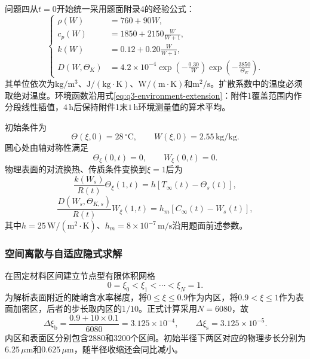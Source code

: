 \documentclass[withoutpreface,bwprint]{cumcmthesis}
\begin{document}
问题四从$t=0$开始统一采用题面附录4的经验公式：
\begin{equation}
\left\{
\begin{aligned}
\rho(W)&=760+90W,\\
c_p(W)&=1850+2150\frac{W}{W+1},\\
k(W)&=0.12+0.20\frac{W}{W+1},\\
D(W,\Theta_K)
&=4.2\times10^{-4}
\exp\!\left(-\frac{0.30}{W}\right)
\exp\!\left(-\frac{3850}{\Theta_K}\right).
\end{aligned}
\right.
\label{eq:q4-properties}
\end{equation}
其单位依次为$\mathrm{kg/m^3}$、$\mathrm{J/(kg\cdot K)}$、$\mathrm{W/(m\cdot K)}$和$\mathrm{m^2/s}$。扩散系数中的温度必须取绝对温度。环境函数沿用式\eqref{eq:q3-environment-extension}：附件1覆盖范围内作分段线性插值，$4\,\mathrm h$后保持附件1末$1\,\mathrm h$环境测量值的算术平均。

初始条件为
\begin{equation}
\Theta(\xi,0)=28\,{}^\circ\mathrm C,
\qquad
W(\xi,0)=2.55\,\mathrm{kg/kg}.
\label{eq:q4-initial-condition}
\end{equation}
圆心处由轴对称性满足
\begin{equation}
\Theta_\xi(0,t)=0,
\qquad
W_\xi(0,t)=0.
\label{eq:q4-center-boundary}
\end{equation}
物理表面的对流换热、传质条件变换到$\xi=1$后为
\begin{equation}
\frac{k(W_s)}{R(t)}\Theta_\xi(1,t)
=h\left[T_\infty(t)-\Theta_s(t)\right],
\label{eq:q4-surface-heat}
\end{equation}
\begin{equation}
\frac{D(W_s,\Theta_{K,s})}{R(t)}W_\xi(1,t)
=h_m\left[C_\infty(t)-W_s(t)\right],
\label{eq:q4-surface-moisture}
\end{equation}
其中$h=25\,\mathrm{W/(m^2\cdot K)}$、$h_m=8\times10^{-7}\,\mathrm{m/s}$沿用题面前述参数。

\subsubsection{空间离散与自适应隐式求解}

在固定材料区间建立节点型有限体积网格
\begin{equation}
0=\xi_0<\xi_1<\cdots<\xi_N=1.
\label{eq:q4-grid}
\end{equation}
为解析表面附近的陡峭含水率梯度，将$0\le\xi\le0.9$作为内区，将$0.9<\xi\le1$作为表面加密区，后者的步长取内区的$1/10$。正式计算采用$N=6080$，故
\begin{equation}
\Delta\xi_{\mathrm b}
=\frac{0.9+10\times0.1}{6080}
=3.125\times10^{-4},
\qquad
\Delta\xi_{\mathrm s}
=3.125\times10^{-5}.
\label{eq:q4-grid-spacings}
\end{equation}
内区和表面区分别包含$2880$和$3200$个区间。初始半径下两区对应的物理步长分别为$6.25\,\mu\mathrm m$和$0.625\,\mu\mathrm m$，随半径收缩还会同比减小。
\end{document}
